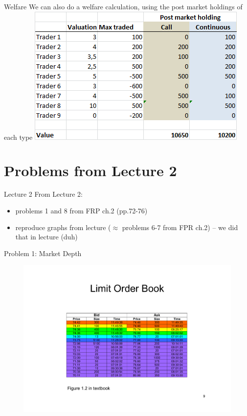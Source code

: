 \documentclass[english,10pt]{beamer}
\theoremstyle{definition}
\begin{document}
\begin{frame}{Welfare}
	We can also do a welfare calculation, using the post market holdings of each type
	\quad
	\center
	\includegraphics[width=.6\linewidth]{pics/Welfare}
	\quad
\end{frame}



\section{Problems from Lecture 2}

\begin{frame}{Lecture 2}
From Lecture 2: 
\begin{itemize}
	\item problems 1 and 8 from FRP ch.2 (pp.72-76)
	\item reproduce graphs from lecture ($\approx$ problems 6-7 from FPR ch.2) -- we did that in lecture (duh)
\end{itemize}
\end{frame}


\begin{frame}{Problem 1: Market Depth}
\begin{figure}
	\includegraphics[width=.7\paperwidth]{pics/Image_LOB}
\end{figure}
\end{frame}
\end{document}
